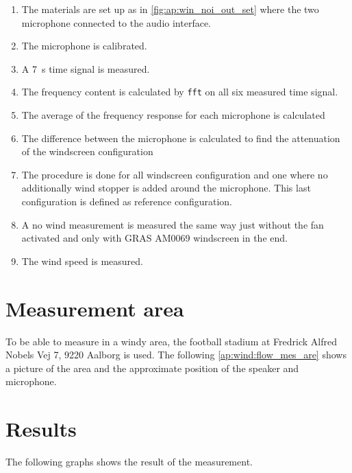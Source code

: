 \begin{enumerate}
\item The materials are set up as in \autoref{fig:ap:win_noi_out_set} where the two microphone connected to the audio interface.
\item The microphone is calibrated.
\item A \SI{7}{\second} time signal is measured.
\item The frequency content is calculated by \texttt{fft} on all six measured time signal.
\item The average of the frequency response for each microphone is calculated
\item The difference between the microphone is calculated to find the attenuation of the windscreen configuration
\item The procedure is done for all windscreen configuration and one where no additionally wind stopper is added around the microphone. This last configuration is defined as reference configuration.
\item A no wind measurement is measured the same way just without the fan activated and only with GRAS AM0069 windscreen in the end.
\item The wind speed is measured.
\end{enumerate}

\section*{Measurement area}
To be able to measure in a windy area, the football stadium at Fredrick Alfred Nobels Vej 7, 9220 Aalborg is used. The following \autoref{ap:wind:flow_mes_are} shows a picture of the area and the approximate position of the speaker and microphone.


\section*{Results}

The following graphs shows the result of the measurement. 






